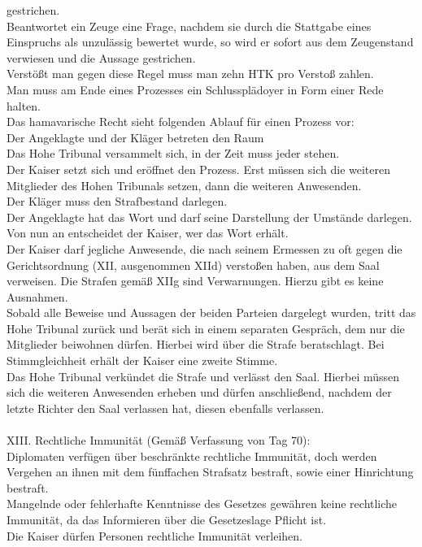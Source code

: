 \documentclass{article}
\begin{document}
gestrichen.\\Beantwortet ein Zeuge eine Frage, nachdem sie durch die Stattgabe eines Einspruchs als unzulässig bewertet wurde, so wird er sofort aus dem Zeugenstand verwiesen und die Aussage gestrichen.\\Verstößt man gegen diese Regel muss man zehn HTK pro Verstoß zahlen.\\Man muss am Ende eines Prozesses ein Schlussplädoyer in Form einer Rede halten.\\Das hamavarische Recht sieht folgenden Ablauf für einen Prozess vor:\\Der Angeklagte und der Kläger betreten den Raum\\Das Hohe Tribunal versammelt sich, in der Zeit muss jeder stehen.\\Der Kaiser setzt sich und eröffnet den Prozess. Erst müssen sich die weiteren Mitglieder des Hohen Tribunals setzen, dann die weiteren Anwesenden.\\Der Kläger muss den Strafbestand darlegen.\\Der Angeklagte hat das Wort und darf seine Darstellung der Umstände darlegen.\\Von nun an entscheidet der Kaiser, wer das Wort erhält.\\Der Kaiser darf jegliche Anwesende, die nach seinem Ermessen zu oft gegen die Gerichtsordnung (XII, ausgenommen XIId) verstoßen haben, aus dem Saal verweisen. Die Strafen gemäß XIIg sind Verwarnungen. Hierzu gibt es keine Ausnahmen.\\Sobald alle Beweise und Aussagen der beiden Parteien dargelegt wurden, tritt das Hohe Tribunal zurück und berät sich in einem separaten Gespräch, dem nur die Mitglieder beiwohnen dürfen. Hierbei wird über die Strafe beratschlagt. Bei Stimmgleichheit erhält der Kaiser eine zweite Stimme.\\Das Hohe Tribunal verkündet die Strafe und verlässt den Saal. Hierbei müssen sich die weiteren Anwesenden erheben und dürfen anschließend, nachdem der letzte Richter den Saal verlassen hat, diesen ebenfalls verlassen.
\\\\
XIII. Rechtliche Immunität (Gemäß Verfassung von Tag 70):\\Diplomaten verfügen über beschränkte rechtliche Immunität, doch werden Vergehen an ihnen mit dem fünffachen Strafsatz bestraft, sowie einer Hinrichtung bestraft.\\Mangelnde oder fehlerhafte Kenntnisse des Gesetzes gewähren keine rechtliche Immunität, da das Informieren über die Gesetzeslage Pflicht ist.\\Die Kaiser dürfen Personen rechtliche Immunität verleihen.
\end{document}
